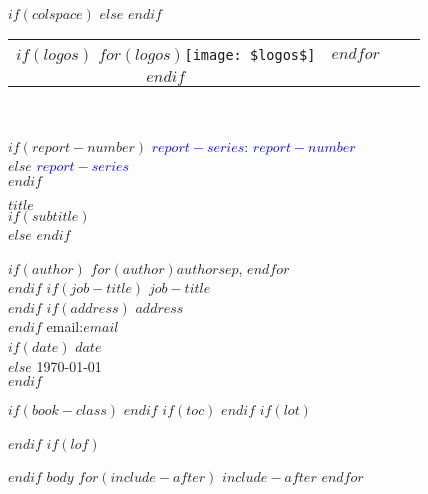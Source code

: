 \documentclass[$if(fontsize)$$fontsize$,$endif$$if(lang)$$lang$,$endif$$if(papersize)$$papersize$,$endif$$for(classoption)$$classoption$$sep$,$endfor$]{$documentclass$}
\begin{document}

\thispagestyle{empty}
\vspace*{30mm}
\begin{flushright}
\HRule\\[5mm]

$if(colspace)$
\setlength{\tabcolsep}{$colspace$}
$else$
\setlength{\tabcolsep}{12pt}
$endif$

\begin{tabular}{cccc}
$if(logos)$
$for(logos)$\texttt{[image: \$logos\$]} & $endfor$\\
$endif$
\end{tabular}\\[5mm]
\setlength{\tabcolsep}{6pt}

\huge
$if(report-number)$
\textcolor{blue}{\sbf $report-series$: $report-number$}\\[6mm]
$else$
\textcolor{blue}{\sbf $report-series$}\\[6mm]
$endif$

{\sbf $title$}\\
\Large
$if(subtitle)$
\vspace{2mm}{\sbf $subtitle$}\\[5mm]
$else$
\vspace{2mm}
$endif$

\sf\normalsize
$if(author)$
$for(author)$$author$$sep$, $endfor$\\
$endif$
$if(job-title)$
$job-title$\\
$endif$
$if(address)$
$address$\\
$endif$
email:\;$email$\\[8mm]

$if(date)$
$date$\\
$else$
\today\\
$endif$
\HRule
\end{flushright}


\clearpage
$if(book-class)$
\frontmatter
$endif$
$if(toc)$
\pagestyle{plain}
\setcounter{page}{1}
\setcounter{tocdepth}{2}
\tableofcontents
\clearpage
$endif$
$if(lot)$
\listoftables
$endif$
$if(lof)$
\listoffigures
$endif$
$body$
$for(include-after)$
$include-after$
$endfor$
\end{document}
